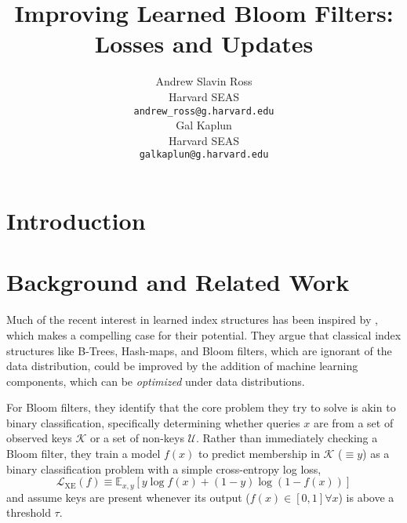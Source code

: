 \documentclass{article}
\title{Improving Learned Bloom Filters: Losses and Updates}
\author{%
  Andrew Slavin Ross \\
  Harvard SEAS \\
  \texttt{andrew\_ross@g.harvard.edu} \\
  \And
  Gal Kaplun \\
  Harvard SEAS \\
  \texttt{galkaplun@g.harvard.edu} \\
}
\begin{document}
\maketitle

\begin{abstract}
\end{abstract}

\section{Introduction}

\section{Background and Related Work}

Much of the recent interest in learned index structures has been inspired by
\citet{kraska2018case}, which makes a compelling case for their potential.
They argue that classical index structures like B-Trees, Hash-maps, and Bloom
filters, which are ignorant of the data distribution, could be improved by the
addition of machine learning components, which can be \emph{optimized} under
data distributions.

For Bloom filters, they identify that the core problem they try to solve is
akin to binary classification, specifically determining whether queries $x$ are
from a set of observed keys $\mathcal{K}$ or a set of non-keys $\mathcal{U}$.
Rather than immediately checking a Bloom filter, they train a model $f(x)$ to
predict membership in $\mathcal{K}$ ($\equiv y$) as a binary classification
problem with a simple cross-entropy log loss, \begin{equation}
  \mathcal{L}_{\mathrm{XE}}(f) \equiv \mathbb{E}_{x,y}\left[ y \log f(x) + (1-y) \log (1-f(x)) \right]
\end{equation}
and assume keys are present whenever its output ($f(x) \in [0,1]
\forall x$) is above a threshold $\tau$.
\end{document}
